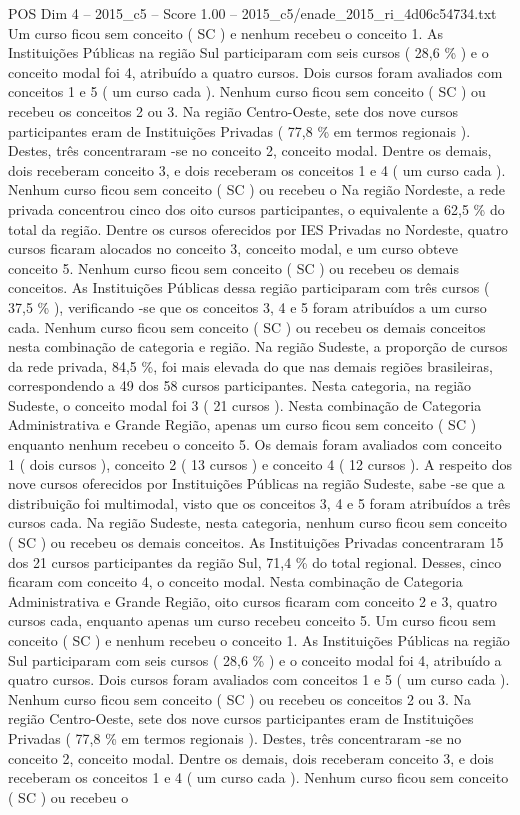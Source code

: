 \begin{textsample}{POS Dim 4 – 2015\_c5 – Score 1.00 – 2015\_c5/enade\_2015\_ri\_4d06c54734.txt}
Um curso ficou sem conceito ( SC ) e nenhum recebeu o conceito 1.
As Instituições Públicas na região Sul participaram com seis cursos ( 28,6 \% ) e o conceito modal foi 4, atribuído a quatro cursos.
Dois cursos foram avaliados com conceitos 1 e 5 ( um curso cada ).
Nenhum curso ficou sem conceito ( SC ) ou recebeu os conceitos 2 ou 3.
Na região Centro-Oeste, sete dos nove cursos participantes eram de Instituições Privadas ( 77,8 \% em termos regionais ).
Destes, três concentraram -se no conceito 2, conceito modal.
Dentre os demais, dois receberam conceito 3, e dois receberam os conceitos 1 e 4 ( um curso cada ).
Nenhum curso ficou sem conceito ( SC ) ou recebeu o Na região Nordeste, a rede privada concentrou cinco dos oito cursos participantes, o equivalente a 62,5 \% do total da região.
Dentre os cursos oferecidos por IES Privadas no Nordeste, quatro cursos ficaram alocados no conceito 3, conceito modal, e um curso obteve conceito 5.
Nenhum curso ficou sem conceito ( SC ) ou recebeu os demais conceitos.
As Instituições Públicas dessa região participaram com três cursos ( 37,5 \% ), verificando -se que os conceitos 3, 4 e 5 foram atribuídos a um curso cada.
Nenhum curso ficou sem conceito ( SC ) ou recebeu os demais conceitos nesta combinação de categoria e região.
Na região Sudeste, a proporção de cursos da rede privada, 84,5 \%, foi mais elevada do que nas demais regiões brasileiras, correspondendo a 49 dos 58 cursos participantes.
Nesta categoria, na região Sudeste, o conceito modal foi 3 ( 21 cursos ).
Nesta combinação de Categoria Administrativa e Grande Região, apenas um curso ficou sem conceito ( SC ) enquanto nenhum recebeu o conceito 5.
Os demais foram avaliados com conceito 1 ( dois cursos ), conceito 2 ( 13 cursos ) e conceito 4 ( 12 cursos ).
A respeito dos nove cursos oferecidos por Instituições Públicas na região Sudeste, sabe -se que a distribuição foi multimodal, visto que os conceitos 3, 4 e 5 foram atribuídos a três cursos cada.
Na região Sudeste, nesta categoria, nenhum curso ficou sem conceito ( SC ) ou recebeu os demais conceitos.
As Instituições Privadas concentraram 15 dos 21 cursos participantes da região Sul, 71,4 \% do total regional.
Desses, cinco ficaram com conceito 4, o conceito modal.
Nesta combinação de Categoria Administrativa e Grande Região, oito cursos ficaram com conceito 2 e 3, quatro cursos cada, enquanto apenas um curso recebeu conceito 5.
Um curso ficou sem conceito ( SC ) e nenhum recebeu o conceito 1.
As Instituições Públicas na região Sul participaram com seis cursos ( 28,6 \% ) e o conceito modal foi 4, atribuído a quatro cursos.
Dois cursos foram avaliados com conceitos 1 e 5 ( um curso cada ).
Nenhum curso ficou sem conceito ( SC ) ou recebeu os conceitos 2 ou 3.
Na região Centro-Oeste, sete dos nove cursos participantes eram de Instituições Privadas ( 77,8 \% em termos regionais ).
Destes, três concentraram -se no conceito 2, conceito modal.
Dentre os demais, dois receberam conceito 3, e dois receberam os conceitos 1 e 4 ( um curso cada ).
Nenhum curso ficou sem conceito ( SC ) ou recebeu o

\end{textsample}
